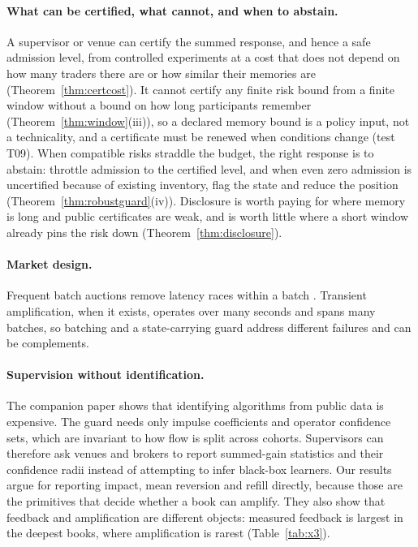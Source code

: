 \documentclass[12pt]{article}
\theoremstyle{definition}
\theoremstyle{remark}
\begin{document}
\paragraph{What can be certified, what cannot, and when to abstain.} A supervisor or venue can certify the summed response, and hence a safe admission level, from controlled experiments at a cost that does not depend on how many traders there are or how similar their memories are (Theorem~\ref{thm:certcost}). It cannot certify any finite risk bound from a finite window without a bound on how long participants remember (Theorem~\ref{thm:window}(iii)), so a declared memory bound is a policy input, not a technicality, and a certificate must be renewed when conditions change (test T09). When compatible risks straddle the budget, the right response is to abstain: throttle admission to the certified level, and when even zero admission is uncertified because of existing inventory, flag the state and reduce the position (Theorem~\ref{thm:robustguard}(iv)). Disclosure is worth paying for where memory is long and public certificates are weak, and is worth little where a short window already pins the risk down (Theorem~\ref{thm:disclosure}).

\paragraph{Market design.} Frequent batch auctions remove latency races within a batch \citep{budish2015}. Transient amplification, when it exists, operates over many seconds and spans many batches, so batching and a state-carrying guard address different failures and can be complements.

\paragraph{Supervision without identification.} The companion paper shows that identifying algorithms from public data is expensive. The guard needs only impulse coefficients and operator confidence sets, which are invariant to how flow is split across cohorts. Supervisors can therefore ask venues and brokers to report summed-gain statistics and their confidence radii instead of attempting to infer black-box learners. Our results argue for reporting impact, mean reversion and refill directly, because those are the primitives that decide whether a book can amplify. They also show that feedback and amplification are different objects: measured feedback is largest in the deepest books, where amplification is rarest (Table~\ref{tab:x3}).
\end{document}
